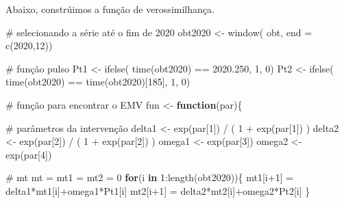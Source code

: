 \documentclass[
  letterpaper,
  DIV=11,
  numbers=noendperiod]{scrartcl}
\newenvironment{Shaded}{\begin{snugshade}}{\end{snugshade}}
\newcommand{\AttributeTok}[1]{\textcolor[rgb]{0.40,0.45,0.13}{#1}}
\newcommand{\CommentTok}[1]{\textcolor[rgb]{0.37,0.37,0.37}{#1}}
\newcommand{\ControlFlowTok}[1]{\textcolor[rgb]{0.00,0.23,0.31}{\textbf{#1}}}
\newcommand{\DecValTok}[1]{\textcolor[rgb]{0.68,0.00,0.00}{#1}}
\newcommand{\FloatTok}[1]{\textcolor[rgb]{0.68,0.00,0.00}{#1}}
\newcommand{\FunctionTok}[1]{\textcolor[rgb]{0.28,0.35,0.67}{#1}}
\newcommand{\NormalTok}[1]{\textcolor[rgb]{0.00,0.23,0.31}{#1}}
\newcommand{\OtherTok}[1]{\textcolor[rgb]{0.00,0.23,0.31}{#1}}
\newcommand{\SpecialCharTok}[1]{\textcolor[rgb]{0.37,0.37,0.37}{#1}}
\theoremstyle{definition}
\theoremstyle{definition}
\theoremstyle{plain}
\theoremstyle{plain}
\theoremstyle{remark}
\begin{document}
Abaixo, constrúimos a função de verossimilhança.

\begin{Shaded}
\begin{Highlighting}[]
\CommentTok{\# selecionando a série até o fim de 2020}
\NormalTok{obt2020 }\OtherTok{\textless{}{-}} \FunctionTok{window}\NormalTok{( obt, }\AttributeTok{end =} \FunctionTok{c}\NormalTok{(}\DecValTok{2020}\NormalTok{,}\DecValTok{12}\NormalTok{))}

\CommentTok{\# função pulso  }
\NormalTok{Pt1 }\OtherTok{\textless{}{-}} \FunctionTok{ifelse}\NormalTok{( }\FunctionTok{time}\NormalTok{(obt2020) }\SpecialCharTok{==} \FloatTok{2020.250}\NormalTok{, }\DecValTok{1}\NormalTok{, }\DecValTok{0}\NormalTok{)}
\NormalTok{Pt2 }\OtherTok{\textless{}{-}} \FunctionTok{ifelse}\NormalTok{( }\FunctionTok{time}\NormalTok{(obt2020) }\SpecialCharTok{==} \FunctionTok{time}\NormalTok{(obt2020)[}\DecValTok{185}\NormalTok{], }\DecValTok{1}\NormalTok{, }\DecValTok{0}\NormalTok{)}

\CommentTok{\# função para encontrar o EMV}
\NormalTok{fun }\OtherTok{\textless{}{-}} \ControlFlowTok{function}\NormalTok{(par)\{}

\CommentTok{\# parâmetros da intervenção}
\NormalTok{delta1 }\OtherTok{\textless{}{-}} \FunctionTok{exp}\NormalTok{(par[}\DecValTok{1}\NormalTok{]) }\SpecialCharTok{/}\NormalTok{ ( }\DecValTok{1} \SpecialCharTok{+} \FunctionTok{exp}\NormalTok{(par[}\DecValTok{1}\NormalTok{]) )}
\NormalTok{delta2 }\OtherTok{\textless{}{-}} \FunctionTok{exp}\NormalTok{(par[}\DecValTok{2}\NormalTok{]) }\SpecialCharTok{/}\NormalTok{ ( }\DecValTok{1} \SpecialCharTok{+} \FunctionTok{exp}\NormalTok{(par[}\DecValTok{2}\NormalTok{]) )}
\NormalTok{omega1 }\OtherTok{\textless{}{-}} \FunctionTok{exp}\NormalTok{(par[}\DecValTok{3}\NormalTok{])}
\NormalTok{omega2 }\OtherTok{\textless{}{-}} \FunctionTok{exp}\NormalTok{(par[}\DecValTok{4}\NormalTok{])}

\CommentTok{\# mt}
\NormalTok{mt }\OtherTok{=}\NormalTok{ mt1 }\OtherTok{=}\NormalTok{ mt2 }\OtherTok{=} \DecValTok{0}
\ControlFlowTok{for}\NormalTok{(i }\ControlFlowTok{in} \DecValTok{1}\SpecialCharTok{:}\FunctionTok{length}\NormalTok{(obt2020))\{}
\NormalTok{  mt1[i}\SpecialCharTok{+}\DecValTok{1}\NormalTok{] }\OtherTok{=}\NormalTok{ delta1}\SpecialCharTok{*}\NormalTok{mt1[i]}\SpecialCharTok{+}\NormalTok{omega1}\SpecialCharTok{*}\NormalTok{Pt1[i]}
\NormalTok{  mt2[i}\SpecialCharTok{+}\DecValTok{1}\NormalTok{] }\OtherTok{=}\NormalTok{ delta2}\SpecialCharTok{*}\NormalTok{mt2[i]}\SpecialCharTok{+}\NormalTok{omega2}\SpecialCharTok{*}\NormalTok{Pt2[i]}
\NormalTok{\}  }


\end{Highlighting}
\end{Shaded}
\end{document}
